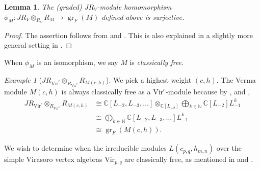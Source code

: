 \documentclass[a4paper, 12pt, reqno]{amsart}
\newtheorem{lemma}[theorem]{Lemma}
\theoremstyle{remark}
\newtheorem{example}[theorem]{Example}
\DeclareMathOperator{\gr}{gr}
\newcommand{\Vir}{{\mathrm{Vir}}}
\begin{document}
\begin{lemma}
  \label{lmm:9}
  The (graded) $JR_V$-module homomorphism $\phi_M: JR_V \otimes_{R_V} R_M \to \gr_F(M)$ defined above is surjective.
\end{lemma}

\begin{proof}
  The assertion follows from  and .
  This is also explained in a slightly more general setting in \cite{arakawa_associated_2015}.
\end{proof}

When $\phi_M$ is an isomorphism, we say $M$ is \emph{classically free}.

\begin{example}[$JR_{\Vir^c} \otimes_{R_{\Vir^c}} R_{M(c, h)}$]
  \label{exa:11}
  We pick a highest weight $(c, h)$.
  The Verma module $M(c, h)$ is always classically free as a $\Vir^c$-module because by ,  and ,
  \begin{align*}
    JR_{\Vir^c} \otimes_{R_{\Vir^c}} R_{M(c, h)} &\cong \mathbb{C}[L_{-2}, L_{-3}, \dots] \otimes_{\mathbb{C}[L_{-2}]} \bigoplus_{k \in \mathbb{N}}\mathbb{C}[L_{-2}]L_{-1}^k \\
                                           &\cong \bigoplus_{k \in \mathbb{N}}\mathbb{C}[L_{-2}, L_{-3}, \dots]L_{-1}^k \\
                                           &\cong \gr_F(M(c, h)).
  \end{align*}
\end{example}

We wish to determine when the irreducible modules $L(c_{p, q}, h_{m, n})$ over the simple Virasoro vertex algebras $\Vir_{p, q}$ are classically free, as mentioned in  and .
\end{document}
